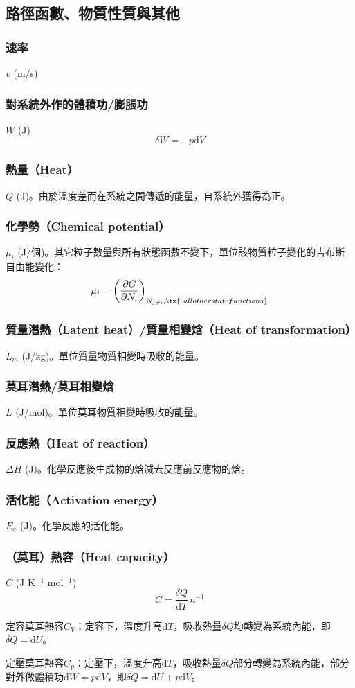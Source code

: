 \documentclass[a4paper,12pt]{report}
\begin{document}
\subsection{路徑函數、物質性質與其他}
\subsubsection{速率}
$v$ (m/s)
\subsubsection{對系統外作的體積功/膨脹功}
$W$ (J)
\[\delta W = -p\mathrm{d}V \]
\subsubsection{熱量（Heat）}
$Q$ (J)。由於溫度差而在系統之間傳遞的能量，自系統外獲得為正。
\subsubsection{化學勢（Chemical potential）}
\(\mu_i\) (J/個)。其它粒子數量與所有狀態函數不變下，單位該物質粒子變化的吉布斯自由能變化：
\[\mu _{i}=\left({\frac {\partial G}{\partial N_{i}}}\right)_{N_{j\neq i},\tx{\ all other state functions}}\]
\subsubsection{質量潛熱（Latent heat）/質量相變焓（Heat of transformation）}
$L_m$ (J/kg)。單位質量物質相變時吸收的能量。
\subsubsection{莫耳潛熱/莫耳相變焓}
$L$ (J/mol)。單位莫耳物質相變時吸收的能量。
\subsubsection{反應熱（Heat of reaction）}
$\Delta H$ (J)。化學反應後生成物的焓減去反應前反應物的焓。
\subsubsection{活化能（Activation energy）}
$E_a$ (J)。化學反應的活化能。
\subsubsection{（莫耳）熱容（Heat capacity）}
$C$ (J K$^{-1}$ mol$^{-1}$)
\[C = \frac{\delta Q}{\mathrm{d}T}\,n^{-1}\]
\bit
\item 定容莫耳熱容$C_V$：定容下，溫度升高$\mathrm{d}T$，吸收熱量$\delta Q$均轉變為系統內能，即$\delta Q = \mathrm{d}U$。
\item 定壓莫耳熱容$C_p$：定壓下，溫度升高$\mathrm{d}T$，吸收熱量$\delta Q$部分轉變為系統內能，部分對外做體積功$\mathrm{d}W = p\mathrm{d}V$，即$\delta Q = \mathrm{d}U + p\mathrm{d}V$。
\eit
\end{document}
